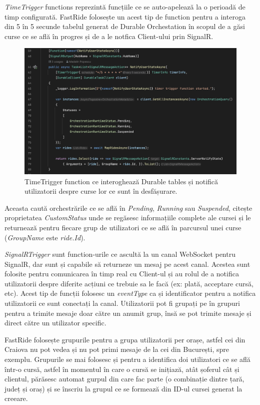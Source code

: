 \textit{TimeTrigger} functions reprezintă funcțiile ce se auto-apelează la o perioadă de timp configurată.
FastRide folosește un acest tip de function pentru a interoga din 5 în 5 secunde tabelul generat
de Durable Orchestation în scopul de a găsi curse ce se află în progres și de a le notfica 
Client-ului prin SignalR.

\begin{figure}[H]
    \centering
    \includegraphics[width=14cm]{Assets/TimeTrigger.png}
    \caption{TimeTrigger function ce interoghează Durable tables și notifică utilizatorii despre curse lor ce sunt în desfășurare.}
    \label{fig:TimeTrigger}
\end{figure}
Aceasta caută orchestrările ce se află în \textit{Pending}, \textit{Running} sau \textit{Suspended},
citește proprietatea \textit{CustomStatus} unde se regăsesc informațiile complete ale cursei și 
le returnează pentru fiecare grup de utilizatori ce se află în parcursul unei curse (\textit{GroupName} este \textit{ride.Id}).

\textit{SignalRTrigger} sunt function-urile ce ascultă la un canal WebSocket pentru SignalR, dar sunt și capabile să returneze
un mesaj pe acest canal. Acestea sunt folosite pentru comunicarea în timp real cu Client-ul și au rolul de a notifica 
utilizatorii despre diferite acțiuni ce trebuie sa le facă (ex: plată, acceptare cursă, etc).
Acest tip de funcții folosesc un \textit{eventType} ca și identificator pentru a notifica utilizatorii ce sunt
conectați la canal. Utilizatorii pot fi grupați pe în grupuri pentru a trimite mesaje doar către un 
anumit grup, însă se pot trimite mesaje și direct către un utilizator specific.

FastRide folosește grupurile pentru a grupa utilizatorii per orașe, astfel cei din Craiova nu pot 
vedea și nu pot primi mesaje de la cei din București, spre exemplu. Grupurile se mai folosesc și 
pentru a identifica doi utilizatori ce se află într-o cursă, astfel în momentul în care o cursă se inițiază,
atât șoferul cât și clientul, părăsesc automat gurpul din care fac parte (o combinație dintre țară, județ și oraș) 
și se înscriu la grupul ce se formează din ID-ul cursei generat la creeare.

